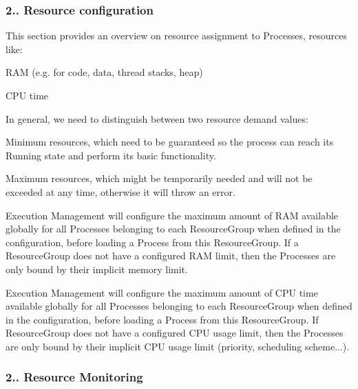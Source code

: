 \subsubsection*{2.. {\bfseries Resource configuration}}


\begin{DoxyItemize}
\item This section provides an overview on resource assignment to Processes, resources like\+:
\begin{DoxyItemize}
\item R\+AM (e.\+g. for code, data, thread stacks, heap)
\item C\+PU time
\end{DoxyItemize}
\item In general, we need to distinguish between two resource demand values\+:
\begin{DoxyItemize}
\item Minimum resources, which need to be guaranteed so the process can reach its Running state and perform its basic functionality.
\item Maximum resources, which might be temporarily needed and will not be exceeded at any time, otherwise it will throw an error.
\end{DoxyItemize}
\item Execution Management will configure the maximum amount of R\+AM available globally for all Processes belonging to each Resource\+Group when defined in the configuration, before loading a Process from this Resource\+Group. If a Resource\+Group does not have a configured R\+AM limit, then the Processes are only bound by their implicit memory limit.
\item Execution Management will configure the maximum amount of C\+PU time available globally for all Processes belonging to each Resource\+Group when defined in the configuration, before loading a Process from this Resource\+Group. If Resource\+Group does not have a configured C\+PU usage limit, then the Processes are only bound by their implicit C\+PU usage limit (priority, scheduling scheme...).
\end{DoxyItemize}

\subsubsection*{2.. {\bfseries Resource Monitoring}}



